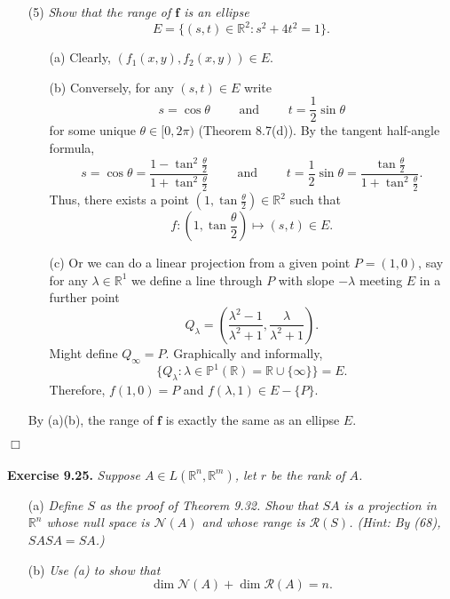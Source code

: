 \documentclass{article}
\begin{document}
\begin{enumerate}
\item[(5)]
  \emph{Show that the range of $\mathbf{f}$ is an ellipse}
  \[
    E = \{ (s,t) \in \mathbb{R}^2 : s^2 + 4t^2 = 1 \}.
  \]
  \begin{enumerate}
  \item[(a)]
    Clearly, $(f_1(x,y), f_2(x,y)) \in E$.

  \item[(b)]
    Conversely, for any $(s,t) \in E$ write
    \[
      s = \cos\theta
      \qquad \text{ and } \qquad
      t = \frac{1}{2} \sin\theta
    \]
    for some unique $\theta \in [0,2\pi)$ (Theorem 8.7(d)).
    By the tangent half-angle formula,
    \[
      s = \cos\theta = \frac{1-\tan^2\frac{\theta}{2}}{1+\tan^2\frac{\theta}{2}}
      \qquad \text{ and } \qquad
      t = \frac{1}{2} \sin\theta = \frac{\tan\frac{\theta}{2}}{1+\tan^2\frac{\theta}{2}}.
    \]
    Thus, there exists a point
    $\left(1, \tan\frac{\theta}{2}\right) \in \mathbb{R}^2$ such that
    \[
      f: \left(1, \tan\frac{\theta}{2}\right)
      \mapsto (s, t) \in E.
    \]

  \item[(c)]
    Or we can do a linear projection from a given point $P = (1,0)$,
    say for any $\lambda \in \mathbb{R}^1$ we define a line through $P$
    with slope $-\lambda$ meeting $E$ in a further point
    \[
      Q_{\lambda}
      = \left(\frac{\lambda^2-1}{\lambda^2+1},
        \frac{\lambda}{\lambda^2+1}\right).
    \]
    Might define $Q_{\infty} = P$.
    Graphically and informally,
    \[
      \{ Q_{\lambda} : \lambda \in \mathbb{P}^1(\mathbb{R}) = \mathbb{R} \cup \{\infty\} \} = E.
    \]
    Therefore, $f(1,0) = P$ and $f(\lambda, 1) \in E-\{P\}$.

  \end{enumerate}
  By (a)(b), the range of $\mathbf{f}$ is exactly the same as an ellipse $E$.

\end{enumerate}
$\Box$ \\\\






\textbf{Exercise 9.25.}
\emph{Suppose $A \in L(\mathbb{R}^n, \mathbb{R}^m)$, let $r$ be the rank of $A$.}
\begin{enumerate}
\item[(a)]
  \emph{Define $S$ as the proof of Theorem 9.32.
  Show that $SA$ is a projection in $\mathbb{R}^n$
  whose null space is $\mathscr{N}(A)$ and whose range is $\mathscr{R}(S)$.
  (Hint: By (68), $SASA = SA$.)}

\item[(b)]
  \emph{Use (a) to show that}
  \[
    \dim \mathscr{N}(A) + \dim \mathscr{R}(A) = n.
  \]
\end{enumerate}
\end{document}
